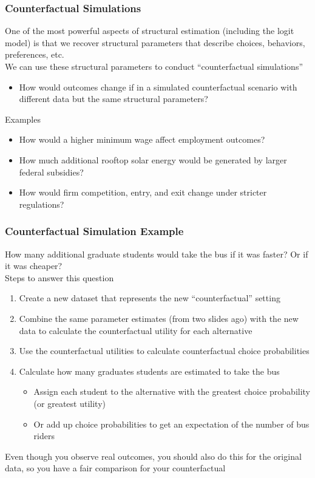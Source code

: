 \documentclass{beamer}\usepackage[]{graphicx}\usepackage[]{color}
\begin{document}
\begin{frame}\frametitle{Counterfactual Simulations}
    One of the most powerful aspects of structural estimation (including the logit model) is that we recover structural parameters that describe choices, behaviors, preferences, etc. \\
    \vspace{2ex}
    We can use these structural parameters to conduct ``counterfactual simulations''
    \begin{itemize}
        \item How would outcomes change if in a simulated counterfactual scenario with different data but the same structural parameters?
    \end{itemize}
    \vspace{2ex}
    Examples
    \begin{itemize}
        \item How would a higher minimum wage affect employment outcomes?
        \item How much additional rooftop solar energy would be generated by larger federal subsidies?
        \item How would firm competition, entry, and exit change under stricter regulations?
    \end{itemize}
\end{frame}

\begin{frame}\frametitle{Counterfactual Simulation Example}
    How many additional graduate students would take the bus if it was faster? Or if it was cheaper? \\
    \vspace{1ex}
    Steps to answer this question
    \begin{enumerate}
        \item Create a new dataset that represents the new ``counterfactual'' setting
        \item Combine the same parameter estimates (from two slides ago) with the new data to calculate the counterfactual utility for each alternative
        \item Use the counterfactual utilities to calculate counterfactual choice probabilities
        \item Calculate how many graduates students are estimated to take the bus
        \begin{itemize}
            \item Assign each student to the alternative with the greatest choice probability (or greatest utility)
            \item Or add up choice probabilities to get an expectation of the number of bus riders
        \end{itemize}
    \end{enumerate}
    \vspace{1ex}
    Even though you observe real outcomes, you should also do this for the original data, so you have a fair comparison for your counterfactual
\end{frame}
\end{document}
